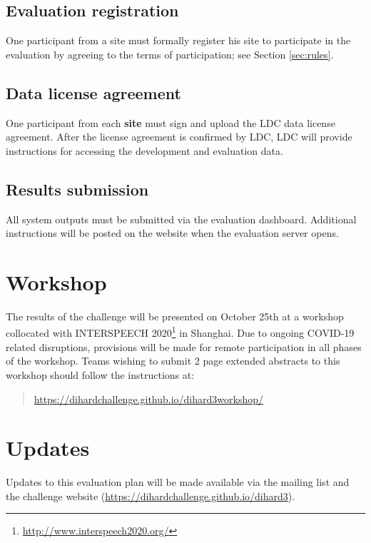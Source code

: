 \documentclass{article}
\begin{document}
\subsection{Evaluation registration}
One participant from a site must formally register his site to participate in the evaluation by agreeing to the terms of participation; see Section \ref{sec:rules}.

\subsection{Data license agreement}
One participant from each {\bf site} must sign and upload the LDC data license agreement. After the license agreement is confirmed by LDC, LDC will provide instructions for accessing the development and evaluation data.

\subsection{Results submission}
All system outputs must be submitted via the evaluation dashboard. Additional instructions will be posted on the website when the evaluation server opens.


\section{Workshop}
The results of the challenge will be presented on October 25th at a workshop collocated with INTERSPEECH 2020\footnote{\url{http://www.interspeech2020.org/}} in Shanghai. Due to ongoing COVID-19 related disruptions, provisions will be made for remote participation in all phases of the workshop. Teams wishing to submit 2 page extended abstracts to this workshop should follow the instructions at:
    \begin{quote}
        \url{https://dihardchallenge.github.io/dihard3workshop/}
    \end{quote}



\section{Updates}
Updates to this evaluation plan will be made available via the mailing list and the challenge website (\url{https://dihardchallenge.github.io/dihard3}).
\end{document}
